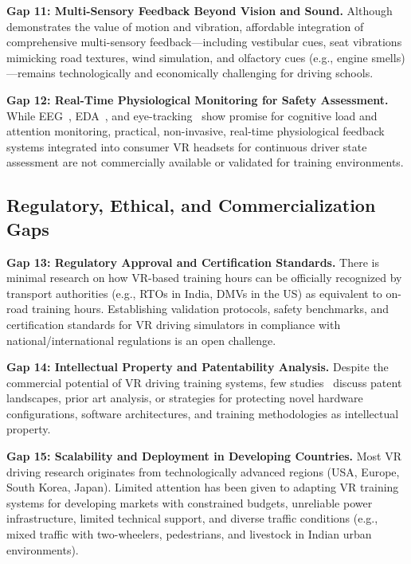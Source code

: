\textbf{Gap 11: Multi-Sensory Feedback Beyond Vision and Sound.} Although~\cite{GilCarvajal2024} demonstrates the value of motion and vibration, affordable integration of comprehensive multi-sensory feedback—including vestibular cues, seat vibrations mimicking road textures, wind simulation, and olfactory cues (e.g., engine smells)—remains technologically and economically challenging for driving schools.

\textbf{Gap 12: Real-Time Physiological Monitoring for Safety Assessment.} While EEG~\cite{Qadir2019}, EDA~\cite{Muguro2023}, and eye-tracking~\cite{Chung2022} show promise for cognitive load and attention monitoring, practical, non-invasive, real-time physiological feedback systems integrated into consumer VR headsets for continuous driver state assessment are not commercially available or validated for training environments.

\subsection{Regulatory, Ethical, and Commercialization Gaps}
\textbf{Gap 13: Regulatory Approval and Certification Standards.} There is minimal research on how VR-based training hours can be officially recognized by transport authorities (e.g., RTOs in India, DMVs in the US) as equivalent to on-road training hours. Establishing validation protocols, safety benchmarks, and certification standards for VR driving simulators in compliance with national/international regulations is an open challenge.

\textbf{Gap 14: Intellectual Property and Patentability Analysis.} Despite the commercial potential of VR driving training systems, few studies~\cite{Jurik2021,Silvera2022} discuss patent landscapes, prior art analysis, or strategies for protecting novel hardware configurations, software architectures, and training methodologies as intellectual property.

\textbf{Gap 15: Scalability and Deployment in Developing Countries.} Most VR driving research originates from technologically advanced regions (USA, Europe, South Korea, Japan). Limited attention has been given to adapting VR training systems for developing markets with constrained budgets, unreliable power infrastructure, limited technical support, and diverse traffic conditions (e.g., mixed traffic with two-wheelers, pedestrians, and livestock in Indian urban environments).

